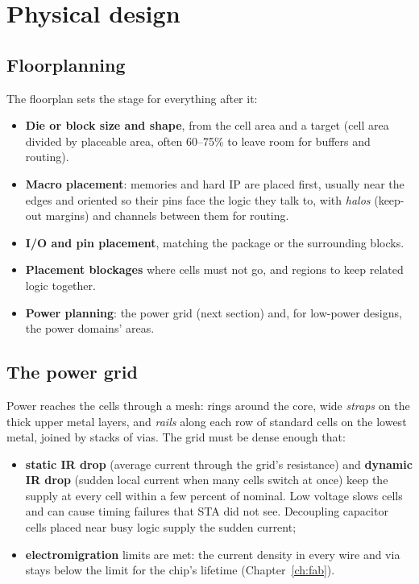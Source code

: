 \section{Physical design}

\subsection*{Floorplanning}

The floorplan sets the stage for everything after it:
\begin{itemize}
  \item \textbf{Die or block size and shape}, from the cell area and a target  (cell area divided by placeable area, often 60--75\% to leave room for buffers and routing).
  \item \textbf{Macro placement}: memories and hard IP are placed first, usually near the edges and oriented so their pins face the logic they talk to, with \emph{halos} (keep-out margins) and channels between them for routing.
  \item \textbf{I/O and pin placement}, matching the package or the surrounding blocks.
  \item \textbf{Placement blockages} where cells must not go, and regions to keep related logic together.
  \item \textbf{Power planning}: the power grid (next section) and, for low-power designs, the power domains' areas.
\end{itemize}

\subsection*{The power grid}

Power reaches the cells through a mesh: rings around the core, wide \emph{straps} on the thick upper metal layers, and \emph{rails} along each row of standard cells on the lowest metal, joined by stacks of vias. The grid must be dense enough that:
\begin{itemize}
  \item \textbf{static IR drop} (average current through the grid's resistance) and \textbf{dynamic IR drop} (sudden local current when many cells switch at once) keep the supply at every cell within a few percent of nominal. Low voltage slows cells and can cause timing failures that STA did not see. Decoupling capacitor cells placed near busy logic supply the sudden current;
  \item \textbf{electromigration} limits are met: the current density in every wire and via stays below the limit for the chip's lifetime (Chapter~\ref{ch:fab}).
\end{itemize}

